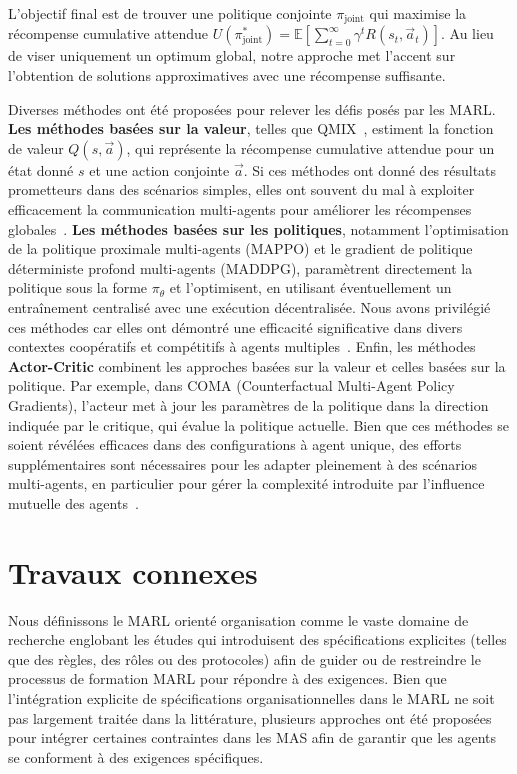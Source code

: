 L'objectif final est de trouver une politique conjointe $\pi_{\text{joint}}$ qui maximise la récompense cumulative attendue $U(\pi^*_{\text{joint}}) = \mathbb{E}\left[\sum_{t=0}^{\infty} \gamma^t R(s_t, \vec{a}_t)\right]$. Au lieu de viser uniquement un optimum global, notre approche met l'accent sur l'obtention de solutions approximatives avec une récompense suffisante.

Diverses méthodes ont été proposées pour relever les défis posés par les MARL.
%
\textbf{Les méthodes basées sur la valeur}, telles que QMIX~\cite{rashid2018}, estiment la fonction de valeur $Q(s,\vec{a})$, qui représente la récompense cumulative attendue pour un état donné $s$ et une action conjointe $\vec{a}$. Si ces méthodes ont donné des résultats prometteurs dans des scénarios simples, elles ont souvent du mal à exploiter efficacement la communication multi-agents pour améliorer les récompenses globales~\cite{oroojlooy2021review}.
%
\textbf{Les méthodes basées sur les politiques}, notamment l'optimisation de la politique proximale multi-agents (MAPPO)\cite{yu2022surprising} et le gradient de politique déterministe profond multi-agents (MADDPG)\cite{lowe2017multi}, paramètrent directement la politique sous la forme $\pi_\theta$ et l'optimisent, en utilisant éventuellement un entraînement centralisé avec une exécution décentralisée. Nous avons privilégié ces méthodes car elles ont démontré une efficacité significative dans divers contextes coopératifs et compétitifs à agents multiples~\cite{yu2022surprising}\cite{lowe2017multi}.
%
Enfin, les méthodes \textbf{Actor-Critic} combinent les approches basées sur la valeur et celles basées sur la politique. Par exemple, dans COMA (Counterfactual Multi-Agent Policy Gradients), l'acteur met à jour les paramètres de la politique dans la direction indiquée par le critique, qui évalue la politique actuelle. Bien que ces méthodes se soient révélées efficaces dans des configurations à agent unique, des efforts supplémentaires sont nécessaires pour les adapter pleinement à des scénarios multi-agents, en particulier pour gérer la complexité introduite par l'influence mutuelle des agents~\cite{papoudakis2021agent}.


\section{Travaux connexes}
\label{sec:related_works}

Nous définissons le MARL orienté organisation comme le vaste domaine de recherche englobant les études qui introduisent des spécifications explicites (telles que des règles, des rôles ou des protocoles) afin de guider ou de restreindre le processus de formation MARL pour répondre à des exigences. Bien que l'intégration explicite de spécifications organisationnelles dans le MARL ne soit pas largement traitée dans la littérature, plusieurs approches ont été proposées pour intégrer certaines contraintes dans les MAS afin de garantir que les agents se conforment à des exigences spécifiques.

